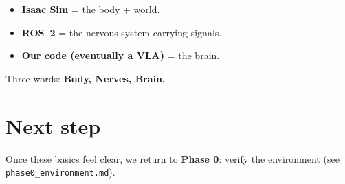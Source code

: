 \documentclass[11pt]{article}
\begin{document}
\begin{itemize}[leftmargin=*]
  \item \textbf{Isaac Sim} = the body + world.
  \item \textbf{ROS~2} = the nervous system carrying signals.
  \item \textbf{Our code (eventually a VLA)} = the brain.
\end{itemize}

\begin{center}
\Large Three words: \textbf{Body, Nerves, Brain.}
\end{center}

\section*{Next step}
Once these basics feel clear, we return to \textbf{Phase 0}: verify the environment
(see \texttt{phase0\_environment.md}).
\end{document}
